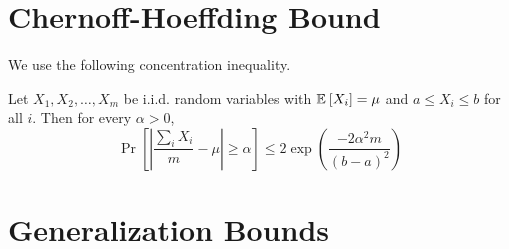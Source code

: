 \section{Chernoff-Hoeffding Bound}

We use the following concentration inequality.


\begin{theorem}\label{chernoff}
  Let $X_1, X_2, \ldots, X_m$ be i.i.d. random variables with
  $\operatorname*{\mathbb{E}}_{}\left[X_i\right] = \mu$ and $a\leq X_i \leq b$ for all $i$. Then for
  every $\alpha  > 0$,
  \[
    \Pr\left[ \left| \frac{\sum_i X_i}{m} - \mu \right| \geq \alpha
    \right] \leq 2 \exp\left(\frac{-2\alpha^2 m }{(b-a)^2} \right)
  \]
\end{theorem}

\section{Generalization Bounds}
\label{app:generalization}


